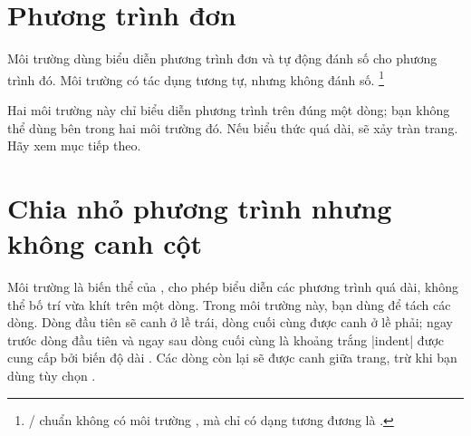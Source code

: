 \documentclass[11pt,leqno,titlepage,openany,oneside]{amsldoc}[1999/12/13]
\begin{document}
\afterpage{\clearpage}

\section{Phương trình đơn}

Môi trường  dùng biểu diễn phương trình đơn
và tự động đánh số cho phương trình đó. Môi trường 
có tác dụng tương tự, nhưng không đánh số.%
\footnote{\latex/ chuẩn không có môi trường , mà
chỉ có dạng tương đương là .}

\medskip

Hai môi trường này chỉ biểu diễn phương trình trên đúng một dòng;
bạn không thể dùng \cn{\\} bên trong hai môi trường đó.
Nếu biểu thức quá dài, sẽ xảy tràn trang. Hãy xem mục tiếp theo.

\section{Chia nhỏ phương trình nhưng không canh cột}

Môi trường  là biến thể của , cho phép
biểu diễn các phương trình quá dài, không thể bố trí vừa khít trên một dòng.
Trong môi trường này, bạn dùng \cn{\\} để tách các dòng.
Dòng đầu tiên sẽ canh ở lề trái, dòng cuối cùng được canh ở lề phải;
ngay trước dòng đầu tiên và ngay sau dòng cuối cùng là khoảng trắng |indent|
được cung cấp bởi biến độ dài .
Các dòng còn lại sẽ được canh giữa trang, trừ khi bạn dùng tùy chọn .
\end{document}
